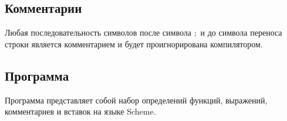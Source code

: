     \subsection{Комментарии}
        Любая последовательность символов после символа $;$ и до символа переноса строки является комментарием и будет проигнорирована компилятором.

        
    
    \subsection{Программа}
        Программа представляет собой набор определений функций, выражений, комментариев и вставок на языке Scheme.

        
